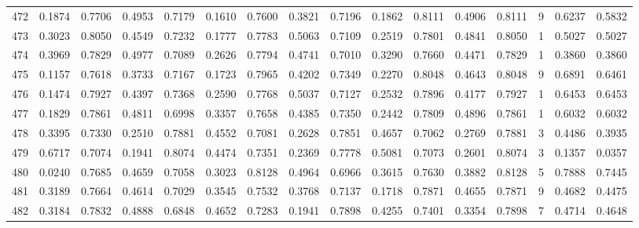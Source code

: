 \begin{tabular}{lrrrrrrrrrrrrrrr}
472 &      0.1874 &  0.7706 &  0.4953 &  0.7179 &  0.1610 &  0.7600 &  0.3821 &  0.7196 &  0.1862 &  0.8111 &   0.4906 &     0.8111 &      9 &                    0.6237 &                     0.5832 \\
473 &      0.3023 &  0.8050 &  0.4549 &  0.7232 &  0.1777 &  0.7783 &  0.5063 &  0.7109 &  0.2519 &  0.7801 &   0.4841 &     0.8050 &      1 &                    0.5027 &                     0.5027 \\
474 &      0.3969 &  0.7829 &  0.4977 &  0.7089 &  0.2626 &  0.7794 &  0.4741 &  0.7010 &  0.3290 &  0.7660 &   0.4471 &     0.7829 &      1 &                    0.3860 &                     0.3860 \\
475 &      0.1157 &  0.7618 &  0.3733 &  0.7167 &  0.1723 &  0.7965 &  0.4202 &  0.7349 &  0.2270 &  0.8048 &   0.4643 &     0.8048 &      9 &                    0.6891 &                     0.6461 \\
476 &      0.1474 &  0.7927 &  0.4397 &  0.7368 &  0.2590 &  0.7768 &  0.5037 &  0.7127 &  0.2532 &  0.7896 &   0.4177 &     0.7927 &      1 &                    0.6453 &                     0.6453 \\
477 &      0.1829 &  0.7861 &  0.4811 &  0.6998 &  0.3357 &  0.7658 &  0.4385 &  0.7350 &  0.2442 &  0.7809 &   0.4896 &     0.7861 &      1 &                    0.6032 &                     0.6032 \\
478 &      0.3395 &  0.7330 &  0.2510 &  0.7881 &  0.4552 &  0.7081 &  0.2628 &  0.7851 &  0.4657 &  0.7062 &   0.2769 &     0.7881 &      3 &                    0.4486 &                     0.3935 \\
479 &      0.6717 &  0.7074 &  0.1941 &  0.8074 &  0.4474 &  0.7351 &  0.2369 &  0.7778 &  0.5081 &  0.7073 &   0.2601 &     0.8074 &      3 &                    0.1357 &                     0.0357 \\
480 &      0.0240 &  0.7685 &  0.4659 &  0.7058 &  0.3023 &  0.8128 &  0.4964 &  0.6966 &  0.3615 &  0.7630 &   0.3882 &     0.8128 &      5 &                    0.7888 &                     0.7445 \\
481 &      0.3189 &  0.7664 &  0.4614 &  0.7029 &  0.3545 &  0.7532 &  0.3768 &  0.7137 &  0.1718 &  0.7871 &   0.4655 &     0.7871 &      9 &                    0.4682 &                     0.4475 \\
482 &      0.3184 &  0.7832 &  0.4888 &  0.6848 &  0.4652 &  0.7283 &  0.1941 &  0.7898 &  0.4255 &  0.7401 &   0.3354 &     0.7898 &      7 &                    0.4714 &                     0.4648 \\

\end{tabular}
